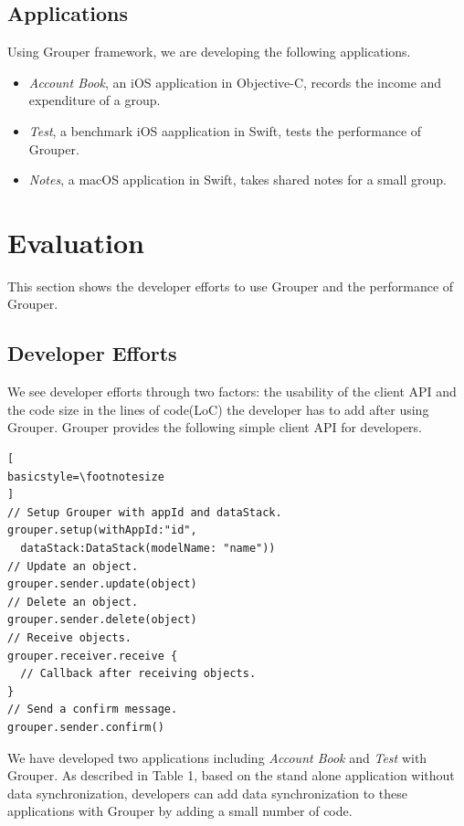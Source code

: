 \documentclass[twocolumn,10pt]{article}
\begin{document}
\subsection{Applications}

Using Grouper framework, we are developing the following applications. 

\begin{itemize}
	\setlength{\itemsep}{1pt}
	\setlength{\parskip}{0pt}
	\setlength{\parsep}{0pt}
	\item \emph{Account Book}, an iOS application in Objective-C, records the income and expenditure of a group.
	\item \emph{Test}, a benchmark iOS aapplication in Swift, tests the performance of Grouper.
	\item \emph{Notes}, a macOS application in Swift, takes shared notes for a small group.
\end{itemize}

\section{Evaluation}

This section shows the developer efforts to use Grouper and the performance of Grouper.

\subsection{Developer Efforts}

We see developer efforts through two factors: the usability of the client API and the code size in the lines of code(LoC) the developer has to add after using Grouper. 
Grouper provides the following simple client API for developers.
\begin{lstlisting}[
basicstyle=\footnotesize
]
// Setup Grouper with appId and dataStack.
grouper.setup(withAppId:"id",
  dataStack:DataStack(modelName: "name"))
// Update an object.
grouper.sender.update(object)
// Delete an object.
grouper.sender.delete(object)
// Receive objects.
grouper.receiver.receive { 
  // Callback after receiving objects.
}
// Send a confirm message.
grouper.sender.confirm()
\end{lstlisting}

We have developed two applications including \emph{Account Book} and \emph{Test} with Grouper. 
As described in Table 1, based on the stand alone application without data synchronization, developers can add data synchronization to these applications with Grouper by adding a small number of code. 
\end{document}
